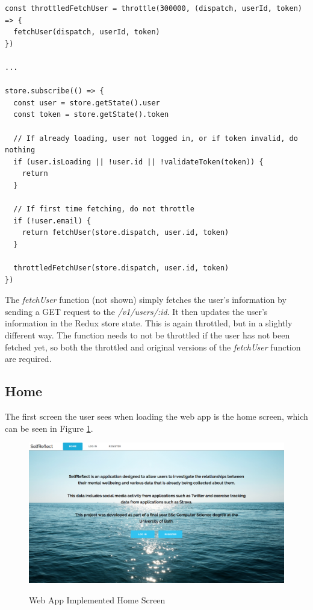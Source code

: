 \documentclass[11pt,openright,a4paper]{report}
\begin{document}
\begin{lstlisting}
const throttledFetchUser = throttle(300000, (dispatch, userId, token) => {
  fetchUser(dispatch, userId, token)
})

...

store.subscribe(() => {
  const user = store.getState().user
  const token = store.getState().token

  // If already loading, user not logged in, or if token invalid, do nothing
  if (user.isLoading || !user.id || !validateToken(token)) {
    return
  }

  // If first time fetching, do not throttle
  if (!user.email) {
    return fetchUser(store.dispatch, user.id, token)
  }

  throttledFetchUser(store.dispatch, user.id, token)
})
\end{lstlisting}

The \emph{fetchUser} function (not shown) simply fetches the user's information by sending a GET request to the \emph{/v1/users/:id}. It then updates the user's information in the Redux store state. This is again throttled, but in a slightly different way. The function needs to not be throttled if the user has not been fetched yet, so both the throttled and original versions of the \emph{fetchUser} function are required.

\subsection{Home}
The first screen the user sees when loading the web app is the home screen, which can be seen in Figure \ref{fig:webhomeimpl}.

\begin{figure}[ht]
\centering
\caption{Web App Implemented Home Screen}
\includegraphics[width=\textwidth]{i/webhomeimpl.png}
\label{fig:webhomeimpl}
\end{figure}
\end{document}
